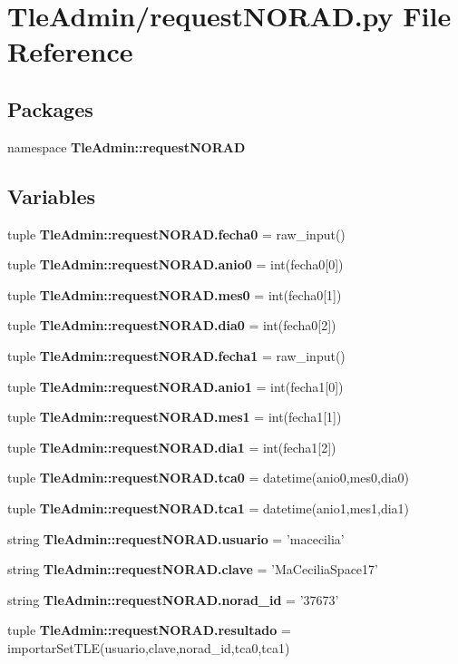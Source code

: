 \section{\-Tle\-Admin/request\-N\-O\-R\-A\-D.py \-File \-Reference}
\label{request_n_o_r_a_d_8py}
\subsection*{\-Packages}
\begin{DoxyCompactItemize}
\item 
namespace {\bf \-Tle\-Admin\-::request\-N\-O\-R\-A\-D}
\end{DoxyCompactItemize}
\subsection*{\-Variables}
\begin{DoxyCompactItemize}
\item 
tuple {\bf \-Tle\-Admin\-::request\-N\-O\-R\-A\-D.\-fecha0} = raw\-\_\-input()
\item 
tuple {\bf \-Tle\-Admin\-::request\-N\-O\-R\-A\-D.\-anio0} = int(fecha0[0])
\item 
tuple {\bf \-Tle\-Admin\-::request\-N\-O\-R\-A\-D.\-mes0} = int(fecha0[1])
\item 
tuple {\bf \-Tle\-Admin\-::request\-N\-O\-R\-A\-D.\-dia0} = int(fecha0[2])
\item 
tuple {\bf \-Tle\-Admin\-::request\-N\-O\-R\-A\-D.\-fecha1} = raw\-\_\-input()
\item 
tuple {\bf \-Tle\-Admin\-::request\-N\-O\-R\-A\-D.\-anio1} = int(fecha1[0])
\item 
tuple {\bf \-Tle\-Admin\-::request\-N\-O\-R\-A\-D.\-mes1} = int(fecha1[1])
\item 
tuple {\bf \-Tle\-Admin\-::request\-N\-O\-R\-A\-D.\-dia1} = int(fecha1[2])
\item 
tuple {\bf \-Tle\-Admin\-::request\-N\-O\-R\-A\-D.\-tca0} = datetime(anio0,mes0,dia0)
\item 
tuple {\bf \-Tle\-Admin\-::request\-N\-O\-R\-A\-D.\-tca1} = datetime(anio1,mes1,dia1)
\item 
string {\bf \-Tle\-Admin\-::request\-N\-O\-R\-A\-D.\-usuario} = 'macecilia'
\item 
string {\bf \-Tle\-Admin\-::request\-N\-O\-R\-A\-D.\-clave} = '\-Ma\-Cecilia\-Space17'
\item 
string {\bf \-Tle\-Admin\-::request\-N\-O\-R\-A\-D.\-norad\-\_\-id} = '37673'
\item 
tuple {\bf \-Tle\-Admin\-::request\-N\-O\-R\-A\-D.\-resultado} = importar\-Set\-T\-L\-E(usuario,clave,norad\-\_\-id,tca0,tca1)
\end{DoxyCompactItemize}
